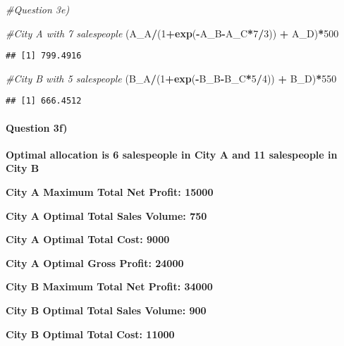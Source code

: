 \documentclass[]{article}
\newenvironment{Shaded}{\begin{snugshade}}{\end{snugshade}}
\newcommand{\CommentTok}[1]{\textcolor[rgb]{0.56,0.35,0.01}{\textit{#1}}}
\newcommand{\DecValTok}[1]{\textcolor[rgb]{0.00,0.00,0.81}{#1}}
\newcommand{\KeywordTok}[1]{\textcolor[rgb]{0.13,0.29,0.53}{\textbf{#1}}}
\newcommand{\NormalTok}[1]{#1}
\newcommand{\OperatorTok}[1]{\textcolor[rgb]{0.81,0.36,0.00}{\textbf{#1}}}
\newcommand{\StringTok}[1]{\textcolor[rgb]{0.31,0.60,0.02}{#1}}
\let\oldparagraph\paragraph
\renewcommand{\paragraph}[1]{\oldparagraph{#1}\mbox{}}
\begin{document}
\begin{Shaded}
\begin{Highlighting}[]
\CommentTok{#Question 3e)}

\CommentTok{#City A with 7 salespeople}
\NormalTok{(A_A}\OperatorTok{/}\NormalTok{(}\DecValTok{1}\OperatorTok{+}\KeywordTok{exp}\NormalTok{(}\OperatorTok{-}\NormalTok{A_B}\OperatorTok{-}\NormalTok{A_C}\OperatorTok{*}\DecValTok{7}\OperatorTok{/}\DecValTok{3}\NormalTok{)) }\OperatorTok{+}\StringTok{ }\NormalTok{A_D)}\OperatorTok{*}\DecValTok{500}
\end{Highlighting}
\end{Shaded}

\begin{verbatim}
## [1] 799.4916
\end{verbatim}

\begin{Shaded}
\begin{Highlighting}[]
\CommentTok{#City B with 5 salespeople}
\NormalTok{(B_A}\OperatorTok{/}\NormalTok{(}\DecValTok{1}\OperatorTok{+}\KeywordTok{exp}\NormalTok{(}\OperatorTok{-}\NormalTok{B_B}\OperatorTok{-}\NormalTok{B_C}\OperatorTok{*}\DecValTok{5}\OperatorTok{/}\DecValTok{4}\NormalTok{)) }\OperatorTok{+}\StringTok{ }\NormalTok{B_D)}\OperatorTok{*}\DecValTok{550}
\end{Highlighting}
\end{Shaded}

\begin{verbatim}
## [1] 666.4512
\end{verbatim}

\hypertarget{question-3f}{%
\paragraph{Question 3f)}\label{question-3f}}

\textbf{Optimal allocation is 6 salespeople in City A and 11 salespeople
in City B}

\textbf{City A Maximum Total Net Profit: 15000}

\textbf{City A Optimal Total Sales Volume: 750}

\textbf{City A Optimal Total Cost: 9000}

\textbf{City A Optimal Gross Profit: 24000}

\textbf{City B Maximum Total Net Profit: 34000}

\textbf{City B Optimal Total Sales Volume: 900}

\textbf{City B Optimal Total Cost: 11000}
\end{document}
